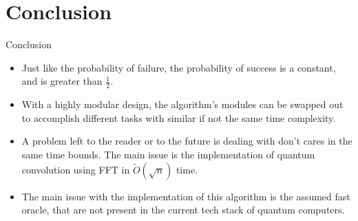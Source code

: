 \documentclass{beamer}
\begin{document}
\section{Conclusion}
\begin{frame}{Conclusion}
  \begin{itemize}
	\item Just like the probability of failure, the probability of success is a constant, and is greater than $\frac12$.
	\item With a highly modular design, the algorithm's modules can be swapped out to accomplish different tasks with similar if not the same time complexity.
	\item A problem left to the reader or to the future is dealing with don't cares in the same time bounds. The main issue is the implementation of quantum convolution using FFT in $\tilde{O}(\sqrt{n})$ time.
	\item The main issue with the implementation of this algorithm is the assumed fast oracle, that are not present in the current tech stack of quantum computers.
  \end{itemize}
\end{frame}
\end{document}
